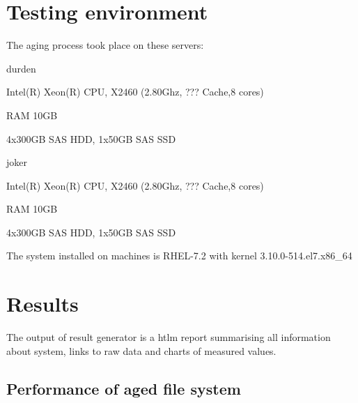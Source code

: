 \documentclass[
  color, %
  table, %
  lof,   %
  lot,   %
]{fithesis3}
\begin{document}


\chapter{Testing environment}
The aging process took place on these servers:
\begin{compactenum}
  \item durden
  \item Intel(R) Xeon(R) CPU, X2460 (2.80Ghz, ??? Cache,8 cores)
  \item RAM 10GB
  \item 4x300GB SAS HDD, 1x50GB SAS SSD
\end{compactenum}

\begin{compactenum}
  \item joker
  \item Intel(R) Xeon(R) CPU, X2460 (2.80Ghz, ??? Cache,8 cores)
  \item RAM 10GB
  \item 4x300GB SAS HDD, 1x50GB SAS SSD
\end{compactenum}



The system installed on machines is RHEL-7.2 with kernel 3.10.0-514.el7.x86\_64 

\chapter{Results}
The output of result generator is a htlm report summarising all information about system, links to raw data and charts of measured values.

\section{Performance of aged file system}
\end{document}
